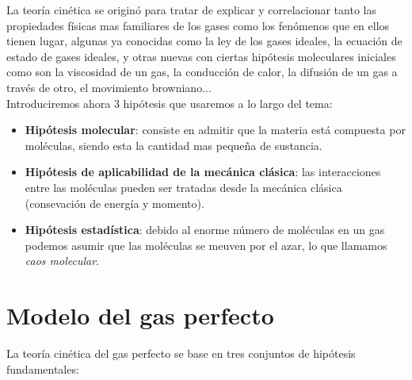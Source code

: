 \documentclass[12pt]{book}
\begin{document}
 La teoría cinética se originó para tratar de explicar y correlacionar tanto las propiedades físicas mas familiares de los gases como los fenómenos que en ellos tienen lugar, algunas ya conocidas como la ley de los gases ideales, la ecuación de estado de gases ideales, y otras nuevas con ciertas hipótesis moleculares iniciales como son la viscosidad de un gas, la conducción de calor, la difusión de un gas a través de otro, el movimiento browniano...   \\
 
Introduciremos ahora 3 hipótesis que usaremos a lo largo del tema:

\begin{itemize}
\item \textbf{Hipótesis molecular}: consiste en admitir que la materia está compuesta por moléculas, siendo esta la cantidad mas pequeña de sustancia.

\item \textbf{Hipótesis de aplicabilidad de la mecánica clásica}: las interacciones entre las moléculas pueden ser tratadas desde la mecánica clásica (consevación de energía y momento).

\item \textbf{Hipótesis estadística}: debido al enorme número de moléculas en un gas podemos asumir que las moléculas se meuven por el azar, lo que llamamos \textit{caos molecular}.
\end{itemize}

\section{Modelo del gas perfecto}

La teoría cinética del gas perfecto se base en tres conjuntos de hipótesis fundamentales:
\end{document}
